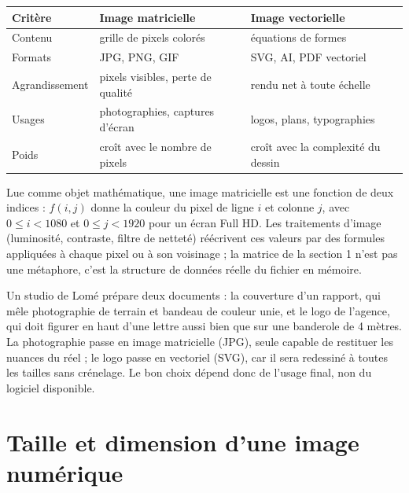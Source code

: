 \begin{center}
\small
\begin{tabular}{L{3.6cm}L{5.9cm}L{5.9cm}}
\toprule
{}\textbf{Critère} & \textbf{Image matricielle} & \textbf{Image vectorielle}\\
\midrule
Contenu & grille de pixels colorés & équations de formes\\
Formats & JPG, PNG, GIF & SVG, AI, PDF vectoriel\\
Agrandissement & pixels visibles, perte de qualité & rendu net à toute échelle\\
Usages & photographies, captures d'écran & logos, plans, typographies\\
Poids & croît avec le nombre de pixels & croît avec la complexité du dessin\\
\bottomrule
\end{tabular}
\label{ch6:tab:formats}
\end{center}

Lue comme objet mathématique, une image matricielle est une fonction de deux indices : $f(i, j)$ donne la couleur du pixel de ligne $i$ et colonne $j$, avec $0 \leqslant i < 1080$ et $0 \leqslant j < 1920$ pour un écran Full HD. Les traitements d'image (luminosité, contraste, filtre de netteté) réécrivent ces valeurs par des formules appliquées à chaque pixel ou à son voisinage ; la matrice de la section 1 n'est pas une métaphore, c'est la structure de données réelle du fichier en mémoire.

\begin{exemple}
Un studio de Lomé prépare deux documents : la couverture d'un rapport, qui mêle photographie de terrain et bandeau de couleur unie, et le logo de l'agence, qui doit figurer en haut d'une lettre aussi bien que sur une banderole de 4 mètres. La photographie passe en image matricielle (JPG), seule capable de restituer les nuances du réel ; le logo passe en vectoriel (SVG), car il sera redessiné à toutes les tailles sans crénelage. Le bon choix dépend donc de l'usage final, non du logiciel disponible.
\end{exemple}

\section{Taille et dimension d'une image numérique}

